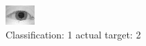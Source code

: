 \begin{figure}[h!]
\begin{center}
\includegraphics[width=0.60\columnwidth]{figures/ID1028_class_1_target_2.png}
\end{center}
\caption{ Classification: 1 actual target: 2}
\label{fig:ID1028_class_1_target_2}
\end{figure}
